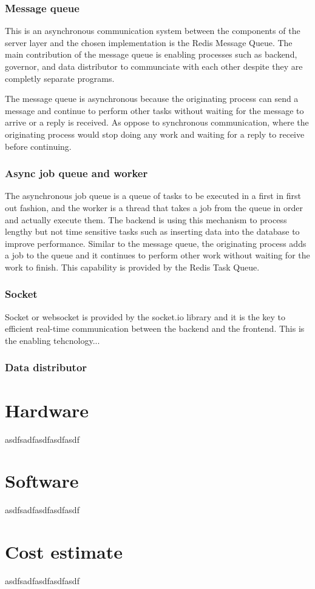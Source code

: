 \documentclass[../thesis.tex]{subfiles}
\begin{document}
\subsubsection{Message queue}

This is an asynchronous communication system between the components of the server layer and the chosen implementation is the Redis Message Queue. The main contribution of the message queue is enabling processes such as backend, governor, and data distributor to communciate with each other despite they are completly separate programs. 

The message queue is asynchronous because the originating process can send a message and continue to perform other tasks without waiting for the message to arrive or a reply is received. As oppose to synchronous communication, where the originating process would stop doing any work and waiting for a reply to receive before continuing.

\subsubsection{Async job queue and worker}

The asynchronous job queue is a queue of tasks to be executed in a first in first out fashion, and the worker is a thread that takes a job from the queue in order and actually execute them. The backend is using this mechanism to process lengthy but not time sensitive tasks such as inserting data into the database to improve performance. Similar to the message queue, the originating process adds a job to the queue and it continues to perform other work without waiting for the work to finish. This capability is provided by the Redis Task Queue. 

\subsubsection{Socket}

Socket or websocket is provided by the socket.io library and it is the key to efficient real-time communication between the backend and the frontend. This is the enabling tehcnology...

\subsubsection{Data distributor}




\newpage
\section{Hardware}

asdfsadfasdfasdfasdf

\section{Software}

asdfsadfasdfasdfasdf

\section{Cost estimate}

asdfsadfasdfasdfasdf
\end{document}
